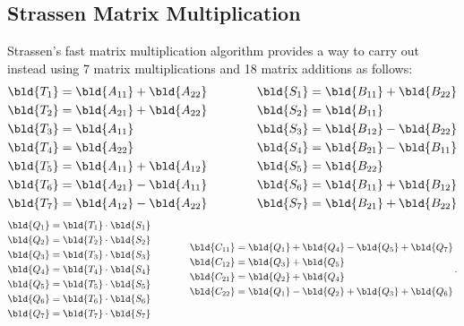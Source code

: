 \subsection{Strassen Matrix Multiplication}
Strassen's fast matrix multiplication algorithm \cite{strassen1969gaussian}
provides a way to carry out  instead using 7 matrix \block multiplications and 18 matrix \block additions as follows:
\begin{align}
  \label{smm:eq:strass-first}
  \begin{split}
    \bld{T_{1}} &= \bld{A_{11}} + \bld{A_{22}}  \\
    \bld{T_{2}} &= \bld{A_{21}} + \bld{A_{22}}  \\
    \bld{T_{3}} &= \bld{A_{11}}  \\
    \bld{T_{4}} &= \bld{A_{22}}  \\
    \bld{T_{5}} &= \bld{A_{11}} + \bld{A_{12}}  \\
    \bld{T_{6}} &= \bld{A_{21}} - \bld{A_{11}}  \\
    \bld{T_{7}} &= \bld{A_{12}} - \bld{A_{22}}
  \end{split}
  \qquad\qquad
  \begin{split}
    \bld{S_{1}} &= \bld{B_{11}} + \bld{B_{22}}  \\
    \bld{S_{2}} &= \bld{B_{11}}  \\
    \bld{S_{3}} &= \bld{B_{12}} - \bld{B_{22}}  \\
    \bld{S_{4}} &= \bld{B_{21}} - \bld{B_{11}}  \\
    \bld{S_{5}} &= \bld{B_{22}}  \\
    \bld{S_{6}} &= \bld{B_{11}} + \bld{B_{12}}  \\
    \bld{S_{7}} &= \bld{B_{21}} + \bld{B_{22}}
  \end{split}
\end{align}
\begin{align}
  \begin{split}
    \bld{Q_{1}} &= \bld{T_{1}} \cdot \bld{S_{1}} \\
    \bld{Q_{2}} &= \bld{T_{2}} \cdot \bld{S_{2}} \\
    \bld{Q_{3}} &= \bld{T_{3}} \cdot \bld{S_{3}} \\
    \bld{Q_{4}} &= \bld{T_{4}} \cdot \bld{S_{4}} \\
    \bld{Q_{5}} &= \bld{T_{5}} \cdot \bld{S_{5}} \\
    \bld{Q_{6}} &= \bld{T_{6}} \cdot \bld{S_{6}} \\
    \bld{Q_{7}} &= \bld{T_{7}} \cdot \bld{S_{7}} \\
  \end{split}
  \qquad\qquad
  \begin{split}
    \label{smm:eq:strass-last}
    \bld{C_{11}} &= \bld{Q_1} + \bld{Q_4} - \bld{Q_5} + \bld{Q_7} \\
    \bld{C_{12}} &= \bld{Q_3} + \bld{Q_5} \\
    \bld{C_{21}} &= \bld{Q_2} + \bld{Q_4} \\
    \bld{C_{22}} &= \bld{Q_1} - \bld{Q_2} + \bld{Q_3} + \bld{Q_6} \\
  \end{split} \,.
\end{align}
